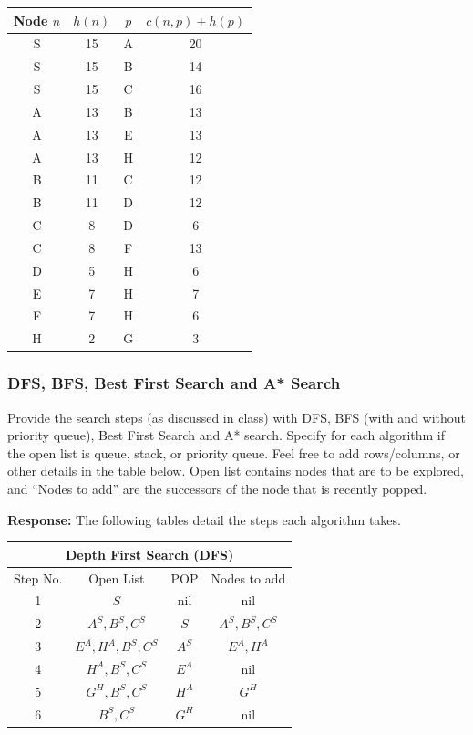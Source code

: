 \documentclass[12pt, letterpaper]{article}
\newcommand{\mybox}[1]{\par\noindent\colorbox{shadecolor}
{\parbox{\dimexpr\textwidth-2\fboxsep\relax}{#1}}}
\begin{document}
\begin{center}
    \begin{tabular}{|c|c|c|c|} 
    \hline
    Node $n$ & $h(n)$ & $p$ & $c(n,p)+h(p)$ \tabularnewline
    \hline
    S & 15 & A & 20\tabularnewline
    \hline
    \rowcolor{red}S & 15 & B & 14\tabularnewline
    \hline
    S & 15 & C & 16\tabularnewline
    \hline
    A & 13 & B & 13\tabularnewline
    \hline
    A & 13 & E & 13\tabularnewline
    \hline
    \rowcolor{red}A & 13 & H & 12\tabularnewline
    \hline
    B & 11 & C & 12\tabularnewline
    \hline
    B & 11 & D & 12\tabularnewline
    \hline
    \rowcolor{red}C & 8 & D & 6\tabularnewline
    \hline
    C & 8 & F & 13\tabularnewline
    \hline
    D & 5 & H & 6\tabularnewline
    \hline
    E & 7 & H & 7\tabularnewline
    \hline
    \rowcolor{red}F & 7 & H & 6\tabularnewline
    \hline
    H & 2 & G & 3\tabularnewline
    \hline

    \end{tabular}
\end{center}

\subsubsection{DFS, BFS, Best First Search and A* Search}
\mybox{Provide the search steps (as discussed in class) with DFS, BFS (with and without priority
queue), Best First Search and A* search. Specify for each algorithm if the open list is
queue, stack, or priority queue. Feel free to add rows/columns, or other details in the
table below. Open list contains nodes that are to be explored, and “Nodes to add” are
the successors of the node that is recently popped.}

\textbf{Response:} The following tables detail the steps each algorithm takes.

\begin{center}
    \begin{tabular}{|c|c|c|c|}
    \hline
    \multicolumn{4}{|c|}{Depth First Search (\textbf{DFS})}\\
    \hline
    Step No. & Open List & POP & Nodes to add \\ 
    \hline
    1 & $S$ & nil & nil \\
    \hline
    2 & $A^S, B^S, C^S$ & $S$ & $A^S, B^S, C^S$ \\
    \hline
    3 & $E^A, H^A, B^S, C^S$ & $A^S$ & $E^A,H^A$ \\
    \hline
    4 & $H^A, B^S, C^S$ & $E^A$ & nil\\
    \hline
    5 & $G^H,B^S,C^S$ & $H^A$ & $G^H$ \\
    \hline
    6 & $B^S,C^S$ & $G^H$ & nil \\
    \hline
    \end{tabular}
\end{center}
\end{document}
